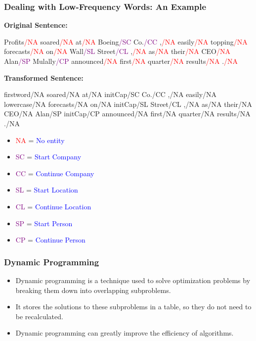 \documentclass[handout]{beamer}
\begin{document}
\begin{frame}
  \frametitle{Dealing with Low-Frequency Words: An Example}
  \scriptsize
  
  
\textbf{Original Sentence:}

  Profits\textcolor{red}{/NA} soared\textcolor{red}{/NA} at\textcolor{red}{/NA} Boeing\textcolor{purple}{/SC} Co.\textcolor{purple}{/CC} ,\textcolor{red}{/NA} easily\textcolor{red}{/NA} topping\textcolor{red}{/NA} forecasts\textcolor{red}{/NA} on\textcolor{red}{/NA} Wall\textcolor{purple}{/SL} Street\textcolor{purple}{/CL} ,\textcolor{red}{/NA} as\textcolor{red}{/NA} their\textcolor{red}{/NA} CEO\textcolor{red}{/NA} Alan\textcolor{purple}{/SP} Mulally\textcolor{purple}{/CP} announced\textcolor{red}{/NA} first\textcolor{red}{/NA} quarter\textcolor{red}{/NA} results\textcolor{red}{/NA} .\textcolor{red}{/NA} \vspace{0.5cm}


\textbf{Transformed Sentence:}

firstword/NA soared/NA at/NA initCap/SC Co./CC ,/NA easily/NA lowercase/NA forecasts/NA on/NA initCap/SL Street/CL ,/NA as/NA their/NA CEO/NA Alan/SP initCap/CP announced/NA first/NA quarter/NA results/NA ./NA \vspace{0.5cm}


  \begin{itemize}
    \item \textcolor{red}{NA} = \textcolor{blue}{No entity}
    \item \textcolor{purple}{SC} = \textcolor{blue}{Start Company}
    \item \textcolor{purple}{CC} = \textcolor{blue}{Continue Company}
    \item \textcolor{purple}{SL} = \textcolor{blue}{Start Location}
    \item \textcolor{purple}{CL} = \textcolor{blue}{Continue Location}
    \item \textcolor{purple}{SP} = \textcolor{blue}{Start Person}
    \item \textcolor{purple}{CP} = \textcolor{blue}{Continue Person}
  \end{itemize}
\end{frame}






\begin{frame}[fragile]
  \frametitle{Dynamic Programming}

  \begin{itemize}
    \item Dynamic programming is a technique used to solve optimization problems by breaking them down into overlapping subproblems.
    \item It stores the solutions to these subproblems in a table, so they do not need to be recalculated.
    \item Dynamic programming can greatly improve the efficiency of algorithms.
  \end{itemize}

\end{frame}
\end{document}
